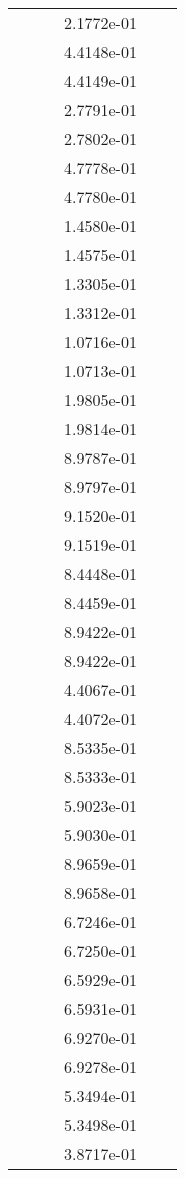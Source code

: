 \begin{xltabular}{\textwidth}{r|rS[table-format=1.3e+2]S[table-format=1.4e+2]S[table-format=1.4e+2]S[table-format=-1.5]}
&  &  & 2.1772e-01 & & \\
&  &  & 4.4148e-01 & & \\
&  &  & 4.4149e-01 & & \\
&  &  & 2.7791e-01 & & \\
&  &  & 2.7802e-01 & & \\
&  &  & 4.7778e-01 & & \\
&  &  & 4.7780e-01 & & \\
&  &  & 1.4580e-01 & & \\
&  &  & 1.4575e-01 & & \\
&  &  & 1.3305e-01 & & \\
&  &  & 1.3312e-01 & & \\
&  &  & 1.0716e-01 & & \\
&  &  & 1.0713e-01 & & \\
&  &  & 1.9805e-01 & & \\
&  &  & 1.9814e-01 & & \\
&  &  & 8.9787e-01 & & \\
&  &  & 8.9797e-01 & & \\
&  &  & 9.1520e-01 & & \\
&  &  & 9.1519e-01 & & \\
&  &  & 8.4448e-01 & & \\
&  &  & 8.4459e-01 & & \\
&  &  & 8.9422e-01 & & \\
&  &  & 8.9422e-01 & & \\
&  &  & 4.4067e-01 & & \\
&  &  & 4.4072e-01 & & \\
&  &  & 8.5335e-01 & & \\
&  &  & 8.5333e-01 & & \\
&  &  & 5.9023e-01 & & \\
&  &  & 5.9030e-01 & & \\
&  &  & 8.9659e-01 & & \\
&  &  & 8.9658e-01 & & \\
&  &  & 6.7246e-01 & & \\
&  &  & 6.7250e-01 & & \\
&  &  & 6.5929e-01 & & \\
&  &  & 6.5931e-01 & & \\
&  &  & 6.9270e-01 & & \\
&  &  & 6.9278e-01 & & \\
&  &  & 5.3494e-01 & & \\
&  &  & 5.3498e-01 & & \\
&  &  & 3.8717e-01 & & \\

\end{xltabular}
